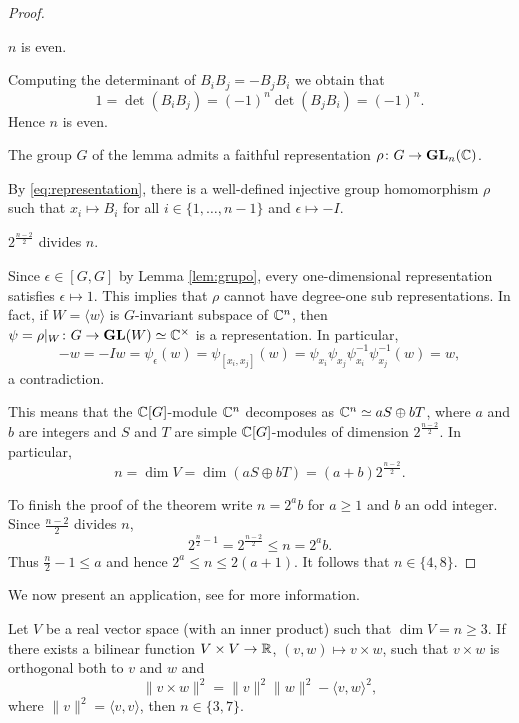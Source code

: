 \begin{proof}
    \begin{claim}
        $n$ is even. 
    \end{claim}
    
	Computing the determinant of 
	$B_iB_j=-B_jB_i$ we obtain that 
	\[
	1=\det(B_iB_j)=(-1)^n\det(B_jB_i)=(-1)^n.
	\]
	Hence $n$ is even. 

	\begin{claim}
	    The group 
	    $G$ of the lemma admits a faithful
	    representation $\rho\colon G\to\mathbf{GL}_n(\mathbb{C})$. 
	\end{claim}
	
	By \eqref{eq:representation}, there is a well-defined 
	injective group homomorphism $\rho$ such that 
	$x_i\mapsto B_i$ for all $i\in\{1,\dots,n-1\}$ and 
	$\epsilon\mapsto -I$. 
	
	\begin{claim}
	    $2^{\frac{n-2}{2}}$ divides $n$.
	\end{claim}
	
	Since $\epsilon\in[G,G]$ by Lemma \ref{lem:grupo}, 
	every one-dimensional representation satisfies $\epsilon\mapsto 1$.
	This implies that $\rho$ cannot have degree-one sub representations. 
	In fact, 
	if $W=\langle w\rangle$ is $G$-invariant subspace of $\mathbb{C}^n$, 
	then $\psi=\rho|_W\colon G\to\mathbf{GL}(W)\simeq\mathbb{C}^\times$ 
	is a representation. In particular, 
	\[
	-w=-Iw=\psi_{\epsilon}(w)=\psi_{[x_i,x_j]}(w)
	=\psi_{x_i}\psi_{x_j}\psi_{{x_i}}^{-1}\psi_{{x_j}}^{-1}(w)=w, 
	\]
	a contradiction. 
	
	This means that the $\mathbb{C}[G]$-module $\mathbb{C}^n$ 
	decomposes as $\mathbb{C}^n\simeq aS\oplus bT$,
	where $a$ and $b$ are integers and 
	$S$ and $T$ are simple $\mathbb{C}[G]$-modules of dimension
	$2^{\frac{n-2}{2}}$. In particular, 
	\[
	n=\dim V=\dim(aS\oplus bT)=(a+b)2^{\frac{n-2}{2}}.
	\]
	
	To finish the proof of the theorem write $n=2^ab$ 
	for $a\geq1$ and $b$ an odd integer. 
	Since $\frac{n-2}{2}$ divides $n$, 
	\[
	2^{\frac{n}{2}-1}=2^{\frac{n-2}{2}}\leq n=2^ab. 
	\]
	Thus $\frac{n}{2}-1\leq a$ and hence $2^a\leq n\leq 2(a+1)$. 
	It follows that $n\in\{4,8\}$.  
\end{proof}

We now present an application, see
\cite{MR1534187} for more information. 

\begin{theorem}
	Let $V$ be a real vector space (with an inner product) 
	such that $\dim
	V=n\geq3$. If there exists a bilinear function 
	$V\times V\to\mathbb{R}$, $(v,w)\mapsto v\times
	w$, such that $v\times w$ is orthogonal both 
	to $v$ and $w$ and 
	\[
		\|v\times w\|^2=\|v\|^2\|w\|^2-\langle v,w\rangle^2,
	\]
	where $\|v\|^2=\langle v,v\rangle$, then $n\in\{3,7\}$. 
\end{theorem}

